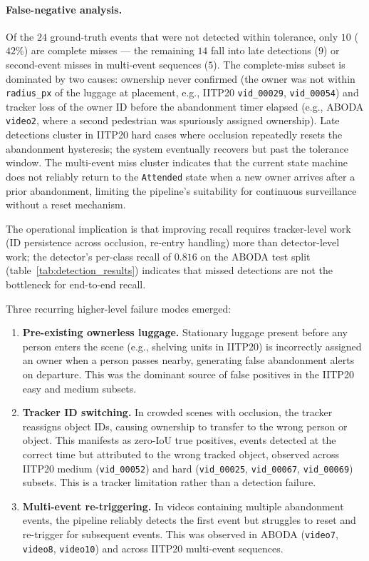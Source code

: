 \paragraph{False-negative analysis.}
Of the $24$ ground-truth events that were not detected within tolerance, only
$10$ ($42\%$) are complete misses --- the remaining $14$ fall into late
detections ($9$) or second-event misses in multi-event sequences ($5$). The
complete-miss subset is dominated by two causes: ownership never confirmed (the
owner was not within \texttt{radius\_px} of the luggage at placement, e.g.,
IITP20 \texttt{vid\_00029}, \texttt{vid\_00054}) and tracker loss of the owner
ID before the abandonment timer elapsed (e.g., ABODA \texttt{video2}, where a
second pedestrian was spuriously assigned ownership). Late detections cluster in IITP20 hard cases
where occlusion repeatedly resets the abandonment hysteresis; the system
eventually recovers but past the tolerance window. The multi-event miss cluster
indicates that the current state machine does not reliably return to the
\texttt{Attended} state when a new owner arrives after a prior abandonment,
limiting the pipeline's suitability for continuous surveillance without a reset
mechanism.

The operational implication is that improving recall requires tracker-level
work (ID persistence across occlusion, re-entry handling) more than
detector-level work; the detector's per-class recall of $0.816$ on the ABODA
test split (table~\ref{tab:detection_results}) indicates that missed detections
are not the bottleneck for end-to-end recall.

Three recurring higher-level failure modes emerged:

\begin{enumerate}
	\item \textbf{Pre-existing ownerless luggage.} Stationary luggage present
	      before any person enters the scene (e.g., shelving units in IITP20) is
	      incorrectly assigned an owner when a person passes nearby, generating
	      false abandonment alerts on departure. This was the dominant source of
	      false positives in the IITP20 easy and medium subsets.
	\item \textbf{Tracker ID switching.} In crowded scenes with occlusion, the
	      tracker reassigns object IDs, causing ownership to transfer to the wrong
	      person or object. This manifests as zero-IoU true positives, events
	      detected at the correct time but attributed to the wrong tracked object,
	      observed across IITP20 medium (\texttt{vid\_00052}) and hard
	      (\texttt{vid\_00025}, \texttt{vid\_00067}, \texttt{vid\_00069}) subsets. This is a
	      tracker limitation rather than a detection failure.
	\item \textbf{Multi-event re-triggering.} In videos containing multiple
	      abandonment events, the pipeline reliably detects the first event but
	      struggles to reset and re-trigger for subsequent events. This was
	      observed in ABODA (\texttt{video7}, \texttt{video8}, \texttt{video10}) and across IITP20 multi-event
	      sequences.
\end{enumerate}

